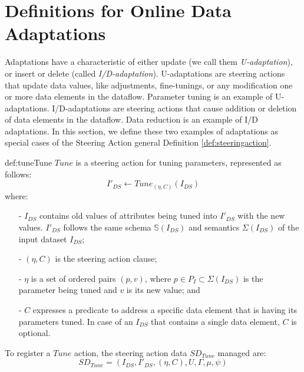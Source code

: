 \section{Definitions for Online Data Adaptations} \label{sec_online_data_adaptations}


Adaptations have a characteristic of either update (we call them \textit{U-adaptation}), or insert or delete (called \textit{I/D-adaptation}).
U-adaptations are steering actions that update data values, like adjustments, fine-tunings, or any modification one or more data elements in the dataflow. Parameter tuning is an example of U-adaptations.
I/D-adaptations are steering actions that cause addition or deletion of data elements in the dataflow. Data reduction is an example of I/D adaptations. In this section, we define these two examples of adaptations as special cases of the Steering Action general Definition \ref{def:steeringaction}.

\begin{mydef}{def:tune}{Tune}
$Tune$ is a steering action for tuning parameters, represented as follows:
$$I'_{DS} \leftarrow Tune_{(\eta,C)}(I_{DS})$$
where:
\begin{itemize}
    \setlength\itemsep{-2mm}
    \item[-] \noindent
         $I_{DS}$ contains old values of attributes being tuned into $I'_{DS}$ with the new values.
         $I'_{DS}$ follows the same schema $\mathbb{S}(I_{DS})$ and semantics $\Sigma(I_{DS})$ of the input dataset $I_{DS}$;
    \item[-] \noindent
        $(\eta,C)$ is the steering action clause;
    \item[-] \noindent
        $\eta$ is a set of ordered pairs $(p,v)$, where $p \in P_I \subset \Sigma(I_{DS})$ is the parameter being tuned and $v$ is its new value;  and
    \item[-] \noindent
        $C$ expresses a predicate to address a specific data element that is having its parameters tuned. In case of an $I_{DS}$ that contains a single data element, $C$ is optional.
\end{itemize}

To register a $Tune$ action, the steering action data $SD_{Tune}$ managed are:
$$SD_{Tune} = (
I_{DS},
I'_{DS},
(\eta,C),
U,
\Gamma,
\mu,
\psi
)$$
\end{mydef}


